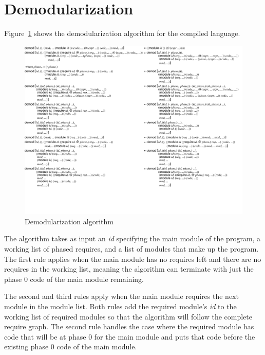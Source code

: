 \section{Demodularization}

Figure~\ref{fig:demod-redex} shows the demodularization algorithm for the compiled language.

\begin{figure}[h]
\includegraphics[width=\textwidth]{figures/demod-redex}
\caption{Demodularization algorithm}
\label{fig:demod-redex}
\end{figure}

The algorithm takes as input an \emph{id} specifying the main module of the program, a working list of phased requires, and a list of modules that make up the program.
The first rule applies when the main module has no requires left and there are no requires in the working list, meaning the algorithm can terminate with just the phase 0 code of the main module remaining.

The second and third rules apply when the main module requires the next module in the module list.
Both rules add the required module's \emph{id} to the working list of required modules so that the algorithm will follow the complete require graph.
The second rule handles the case where the required module has code that will be at phase 0 for the main module and puts that code before the existing phase 0 code of the main module.

